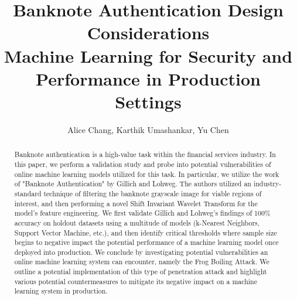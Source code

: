 \documentclass{article}
\begin{document}
\title{%
  \textbf{Banknote Authentication Design Considerations} \\
  \large Machine Learning for Security and  \\
    Performance in Production Settings}
\author{Alice Chang, Karthik Umashankar, Yu Chen}
\maketitle

\begin{abstract}
Banknote authentication is a high-value task within the financial services industry. In this paper, we perform a validation study and probe into potential vulnerabilities of online machine learning models utilized for this task. In particular, we utilize the work of  "Banknote Authentication" by Gillich and Lohweg\cite{original_paper}. The authors utilized an industry-standard technique of filtering the banknote grayscale image for viable regions of interest, and then performing a novel Shift Invariant Wavelet Transform for the model's feature engineering. We first validate Gillich and Lohweg's findings of 100\% accuracy on holdout datasets using a multitude of models (k-Nearest Neighbors, Support Vector Machine, etc.), and then identify critical thresholds where sample size begins to negative impact the potential performance of a machine learning model once deployed into production.
\newline\newline
We conclude by investigating potential vulnerabilities an online machine learning system can encounter, namely the Frog Boiling Attack. We outline a potential implementation of this type of penetration attack and highlight various potential countermeasures to mitigate its negative impact on a machine learning system in production.
\end{abstract}
\end{document}
